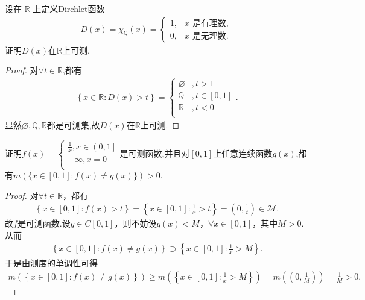 \documentclass[../../main.tex]{subfiles}
\begin{document}
\begin{example}
设在 \(\mathbb{R}\) 上定义Dirchlet函数
\begin{align*}
D(x)=\chi_{\mathbb{Q}}(x)=\begin{cases}
1, & x\text{ 是有理数},\\
0, & x\text{ 是无理数}.
\end{cases}
\end{align*}
证明$D(x)$在$\mathbb{R}$上可测.
\end{example}
\begin{proof}
对$\forall t\in \mathbb{R}$,都有
\begin{align*}
\left\{ x\in \mathbb{R} :D\left( x \right) >t \right\} =\begin{cases}
\varnothing &,t>1\\
\mathbb{Q} &,t\in \left[ 0,1 \right]\\
\mathbb{R} &,t<0\\
\end{cases}.
\end{align*}
显然$\varnothing,\mathbb{Q},\mathbb{R}$都是可测集,故$D\left( x \right)$在$\mathbb{R}$上可测.
\end{proof}

\begin{example}
证明$f\left( x \right) =\begin{cases}
\frac{1}{x},x\in \left( 0,1 \right]\\
+\infty ,x=0\\
\end{cases}$是可测函数,并且对$[0,1]$上任意连续函数$g(x)$,都有$m(\{x\in [0,1]:f(x)\ne g(x)\})>0$.
\end{example}
\begin{proof}
对$\forall t\in \mathbb{R}$，都有
\begin{align*}
\left\{ x\in \left[ 0,1 \right] :f\left( x \right) >t \right\} =\left\{ x\in \left[ 0,1 \right] :\frac{1}{x}>t \right\} =\left( 0,\frac{1}{t} \right) \in \mathscr{M}.
\end{align*}
故$f$是可测函数.设$g\in C\left[ 0,1 \right]$，则不妨设$g\left( x \right) <M$，$\forall x\in \left[ 0,1 \right]$，其中$M>0$.从而
\begin{align*}
\left\{ x\in \left[ 0,1 \right] :f\left( x \right) \ne g\left( x \right) \right\} \supset \left\{ x\in \left[ 0,1 \right] :\frac{1}{x}>M \right\}.
\end{align*}
于是由测度的单调性可得
\begin{align*}
m\left( \left\{ x\in \left[ 0,1 \right] :f\left( x \right) \ne g\left( x \right) \right\} \right) \geqslant m\left( \left\{ x\in \left[ 0,1 \right] :\frac{1}{x}>M \right\} \right) =m\left( \left( 0,\frac{1}{M} \right) \right) =\frac{1}{M}>0.
\end{align*}
\end{proof}
\end{document}
